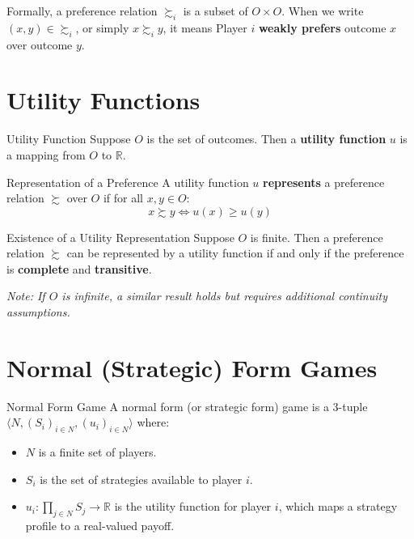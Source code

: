 \documentclass[12pt, a4paper]{article}
\begin{document}
Formally, a preference relation $\succsim_i$ is a subset of $O \times O$. When we write $(x, y) \in {\succsim_i}$, or simply $x \succsim_i y$, it means Player $i$ \textbf{weakly prefers} outcome $x$ over outcome $y$.

\section{Utility Functions}

\begin{defbox}{Utility Function}
  Suppose $O$ is the set of outcomes. Then a \textbf{utility function} $u$ is a mapping from $O$ to $\mathbb{R}$.
\end{defbox}

\begin{defbox}{Representation of a Preference}
  A utility function $u$ \textbf{represents} a preference relation $\succsim$ over $O$ if for all $x, y \in O$:
  \[
    x \succsim y \iff u(x) \geq u(y)
  \]
\end{defbox}

\begin{thmbox}{Existence of a Utility Representation}
  Suppose $O$ is finite. Then a preference relation $\succsim$ can be represented by a utility function if and only if the preference is \textbf{complete} and \textbf{transitive}.
  
  \textit{Note: If $O$ is infinite, a similar result holds but requires additional continuity assumptions.}
\end{thmbox}

\section{Normal (Strategic) Form Games}

\begin{defbox}{Normal Form Game}
  A normal form (or strategic form) game is a 3-tuple $\langle N, (S_i)_{i \in N}, (u_i)_{i \in N} \rangle$ where:
  \begin{itemize}
      \item $N$ is a finite set of players.
      \item $S_i$ is the set of strategies available to player $i$.
      \item $u_i : \prod_{j \in N} S_j \to \mathbb{R}$ is the utility function for player $i$, which maps a strategy profile to a real-valued payoff.
  \end{itemize}
\end{defbox}
\end{document}
